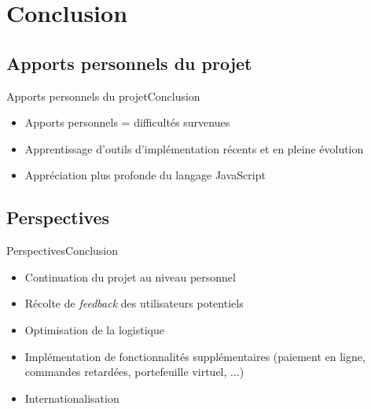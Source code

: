 \documentclass[usenames,dvipsnames]{beamer}
\begin{document}
\section{Conclusion}
\subsection{Apports personnels du projet}
\begin{frame}{Apports personnels du projet}{Conclusion}
  \begin{itemize}
    \item Apports personnels = difficultés survenues
    \item Apprentissage d'outils d'implémentation récents et en pleine évolution
    \item Appréciation plus profonde du langage JavaScript
  \end{itemize}
\end{frame}

\subsection{Perspectives}
\begin{frame}{Perspectives}{Conclusion}
  \begin{itemize}
    \item Continuation du projet au niveau personnel
    \item Récolte de \textit{feedback} des utilisateurs potentiels
    \item Optimisation de la logistique
    \item Implémentation de fonctionnalités supplémentaires (paiement en ligne, commandes retardées, portefeuille virtuel, $\dots$)
    \item Internationalisation
 \end{itemize}
\end{frame}
\end{document}
